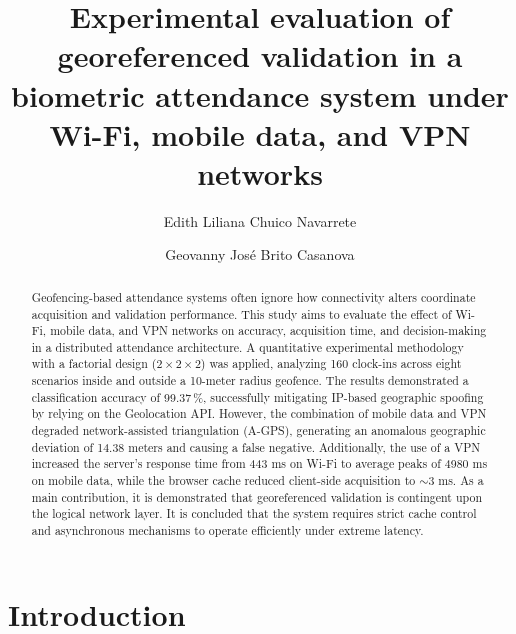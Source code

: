 \documentclass[runningheads]{llncs}
\begin{document}
%
\title{Experimental evaluation of georeferenced validation in a biometric attendance system under Wi-Fi, mobile data, and VPN networks}


\author{Edith Liliana Chuico Navarrete \and
Geovanny José Brito Casanova}



\maketitle               %
%
\begin{abstract}
Geofencing-based attendance systems often ignore how connectivity alters coordinate acquisition and validation performance. This study aims to evaluate the effect of Wi-Fi, mobile data, and VPN networks on accuracy, acquisition time, and decision-making in a distributed attendance architecture. A quantitative experimental methodology with a factorial design ($2\times2\times2$) was applied, analyzing 160 clock-ins across eight scenarios inside and outside a 10-meter radius geofence. The results demonstrated a classification accuracy of 99.37\,\%, successfully mitigating IP-based geographic spoofing by relying on the Geolocation API. However, the combination of mobile data and VPN degraded network-assisted triangulation (A-GPS), generating an anomalous geographic deviation of 14.38 meters and causing a false negative. Additionally, the use of a VPN increased the server's response time from 443 ms on Wi-Fi to average peaks of 4980 ms on mobile data, while the browser cache reduced client-side acquisition to $\sim$3 ms. As a main contribution, it is demonstrated that georeferenced validation is contingent upon the logical network layer. It is concluded that the system requires strict cache control and asynchronous mechanisms to operate efficiently under extreme latency.

\end{abstract}
%
%
%
\section{Introduction}
\end{document}
